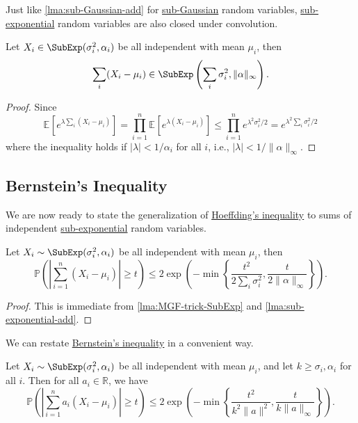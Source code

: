 Just like \autoref{lma:sub-Gaussian-add} for \hyperref[def:sub-Gaussian]{sub-Gaussian} random variables, \hyperref[def:sub-exponential]{sub-exponential} random variables are also closed under convolution.

\begin{lemma}\label{lma:sub-exponential-add}
	Let \(X_i \in \SubExp(\sigma _i^{2} , \alpha _i) \) be all independent with mean \(\mu _i\), then
	\[
		\sum_{i} (X_i - \mu _i) \in \SubExp\left( \sum_{i} \sigma _i^2, \lVert \alpha  \rVert_\infty \right).
	\]
\end{lemma}
\begin{proof}
	Since
	\[
		\mathbb{E}_{}\left[e^{\lambda \sum_{i} (X_i - \mu _i)} \right]
		= \prod_{i=1}^{n} \mathbb{E}_{}\left[e^{\lambda (X_i - \mu _i)} \right]
		\leq \prod_{i=1}^n e^{\lambda ^2 \sigma _i^2 / 2}
		= e^{\lambda ^{2} \sum_{i} \sigma _i ^2 / 2}
	\]
	where the inequality holds if \(\vert \lambda \vert < 1 / \alpha _i\) for all \(i\), i.e., \(\vert \lambda \vert < 1 / \lVert \alpha \rVert_\infty \).
\end{proof}

\subsection{Bernstein's Inequality}
We are now ready to state the generalization of \hyperref[thm:Hoeffding-inequality]{Hoeffding's inequality} to sums of independent \hyperref[def:sub-exponential]{sub-exponential} random variables.

\begin{theorem}\label{thm:Bernstein-inequality}
	Let \(X_i \sim \SubExp(\sigma _i^{2} , \alpha _i) \) be all independent with mean \(\mu _i\), then
	\[
		\mathbb{P} \left( \left\vert \sum_{i=1}^{n} (X_i - \mu _i) \right\vert \geq t \right) \leq 2 \exp \left( - \min \left\{ \frac{t^{2} }{2 \sum_{i} \sigma _i^2}, \frac{t}{2 \lVert \alpha \rVert_\infty } \right\} \right) .
	\]
\end{theorem}
\begin{proof}
	This is immediate from \autoref{lma:MGF-trick-SubExp} and \autoref{lma:sub-exponential-add}.
\end{proof}

We can restate \hyperref[thm:Bernstein-inequality]{Bernstein's inequality} in a convenient way.

\begin{corollary}\label{col:Bernstein-inequality}
	Let \(X_i \sim \SubExp(\sigma _i^{2} , \alpha _i) \) be all independent with mean \(\mu _i\), and let \(k \geq \sigma _i, \alpha _i\) for all \(i\). Then for all \(a_i\in \mathbb{R} \), we have
	\[
		\mathbb{P} \left( \left\vert  \sum_{i=1}^{n} a_i(X_i - \mu _i) \right\vert  \geq t \right) \leq 2 \exp \left( - \min \left\{ \frac{t^{2} }{k^2 \lVert a \rVert ^2}, \frac{t}{k \lVert a \rVert _\infty } \right\} \right) .
	\]
\end{corollary}

